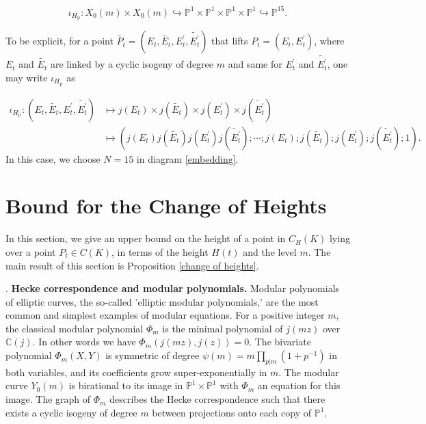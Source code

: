 \documentclass[12pt]{amsart}
\theoremstyle{definition}
\theoremstyle{remark}
\numberwithin{equation}{section}
\newcommand{\C}{\mathbb{C}}
\renewcommand{\P}{\mathbb{P}}
\begin{document}
\begin{equation}\label{iotaHp}
	\iota_{H_{\operatorname{p}}}: X_{0}(m) \times X_{0}(m) \hookrightarrow \P^{1} \times \P^{1} \times \P^{1} \times \P^{1} \hookrightarrow \P^{15}.
\end{equation}

To be explicit, for a point $\tilde{P_{t}}=(E_{t},\tilde{E_{t}}, E_{t}^{\prime}, \tilde{E_{t}^{\prime}})$ that lifts $P_{t}=(E_{t},E_{t}^{\prime})$, where $E_{t}$ and $\tilde{E_{t}}$ are linked by a cyclic isogeny of degree $m$ and same for $E_{t}^{\prime}$ and $\tilde{E_{t}^{\prime}}$, one may write $\iota_{H_{\operatorname{p}}}$ as 

\begin{align*}
\iota_{H_{\operatorname{p}}}: (E_{t}, \tilde{E_{t}}, E_{t}^{\prime}, \tilde{E_{t}^{\prime}}) 
	 &\mapsto  j(E_{t}) \times j(\tilde{E_{t}}) \times j(E_{t}^{\prime}) \times j(\tilde{E_{t}^{\prime}}) \\
	 &\mapsto (j(E_{t})j(\tilde{E_{t}})j(E_{t}^{\prime})j(\tilde{E_{t}^{\prime}}); \cdots; j(E_{t}); j(\tilde{E_{t}}); j(E_{t}^{\prime}); j(\tilde{E_{t}^{\prime}}); 1).
\end{align*}
In this case, we choose $N=15$ in diagram \ref{embedding}.


  \section{Bound for the Change of Heights}
  
  In this section, we give an upper bound on the height of a point in $C_{H}(K)$ lying over a point $P_{t} \in C(K)$, in terms of the height $H(t)$ and the level $m$. The main result of this section is Proposition \ref{change of heights}.
  
\vspace{1em}
. \textbf{Hecke correspondence and modular polynomials.} Modular polynomials of elliptic curves, the so-called 'elliptic modular polynomials,' are the most common and simplest examples of modular equations. For a positive integer $m$, the classical modular polynomial $\Phi_{m}$ is the minimal polynomial of $j(mz)$ over $\C(j)$. In other words we have $\Phi_{m}(j(mz),j(z))=0$. The bivariate polynomial $\Phi_{m}(X,Y)$ is symmetric of degree $\psi(m)=m\prod_{p\vert   m}(1+p^{-1})$ in both variables, and its coefficients grow super-exponentially in $m$. The modular curve $Y_{0}(m)$ is birational to its image in $\P^{1} \times \P^{1}$ with $\Phi_{m}$ an equation for this image. The graph of $\Phi_{m}$ describes the Hecke correspondence such that there exists a cyclic isogeny of degree $m$ between projections onto each copy of $\P^{1}$. 
\end{document}
